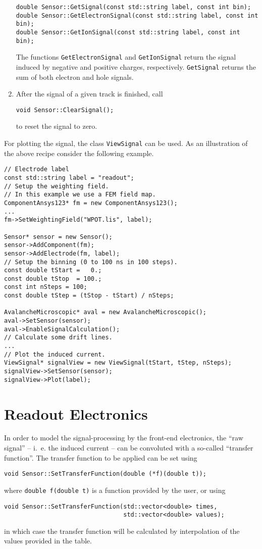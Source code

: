 \begin{enumerate}
\begin{lstlisting}
double Sensor::GetSignal(const std::string label, const int bin);
double Sensor::GetElectronSignal(const std::string label, const int bin);
double Sensor::GetIonSignal(const std::string label, const int bin); 
  \end{lstlisting}
  The functions \texttt{GetElectronSignal} and 
  \texttt{GetIonSignal} return the signal induced by negative 
  and positive charges, respectively. \texttt{GetSignal} returns 
  the sum of both electron and hole signals.   
  \item
  After the signal of a given track is finished, call
  \begin{lstlisting}
void Sensor::ClearSignal();
  \end{lstlisting}
  to reset the signal to zero.
\end{enumerate}

For plotting the signal, the class \texttt{ViewSignal} can be used.
As an illustration of the above recipe consider the following example. 
\begin{lstlisting}
// Electrode label
const std::string label = "readout";
// Setup the weighting field.
// In this example we use a FEM field map.
ComponentAnsys123* fm = new ComponentAnsys123();
...
fm->SetWeightingField("WPOT.lis", label);

Sensor* sensor = new Sensor();
sensor->AddComponent(fm);
sensor->AddElectrode(fm, label);
// Setup the binning (0 to 100 ns in 100 steps).
const double tStart =   0.;
const double tStop  = 100.;
const int nSteps = 100;
const double tStep = (tStop - tStart) / nSteps;

AvalancheMicroscopic* aval = new AvalancheMicroscopic();
aval->SetSensor(sensor);
aval->EnableSignalCalculation();
// Calculate some drift lines.
...
// Plot the induced current.
ViewSignal* signalView = new ViewSignal(tStart, tStep, nSteps);
signalView->SetSensor(sensor);
signalView->Plot(label);
\end{lstlisting}

\section{Readout Electronics}

In order to model the signal-processing by the front-end electronics, the 
``raw signal'' -- i.~e. the induced current -- 
can be convoluted with a so-called ``transfer function''. 
The transfer function to be applied can be set using
\begin{lstlisting}
void Sensor::SetTransferFunction(double (*f)(double t));
\end{lstlisting}
where \texttt{double f(double t)} is a function provided by the user, 
or using
\begin{lstlisting}
void Sensor::SetTransferFunction(std::vector<double> times,
                                 std::vector<double> values);
\end{lstlisting}
in which case the transfer function will be calculated by 
interpolation of the values provided in the table.

